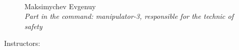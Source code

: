 \begin{figure}[H]
\begin{minipage}[h]{0.47\linewidth}
		\\
		Maksimychev Evgenuy\\
		\emph{Part in the command: manipulator-3, responsible for the technic of safety}
	\end{minipage}
\end{figure}

\newpage

\large  Instructors:

